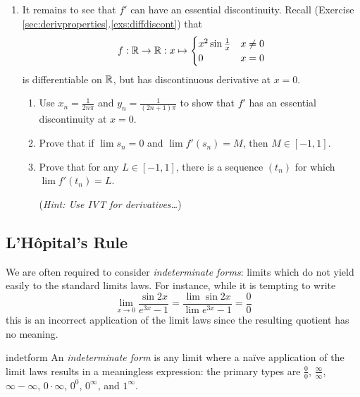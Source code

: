 \begin{exercises}
\begin{enumerate}
\begin{enumerate}
	  	\item It remains to see that $f'$ can have an essential discontinuity. Recall (Exercise \ref*{sec:derivproperties}.\ref{exs:diffdiscont}) that
			\[
				f:\mathbb{R}\to\mathbb{R}:x\mapsto 
				\begin{cases}
					x^2\sin\frac 1x&x\neq 0\\
					0&x=0
				\end{cases}
			\]
			is differentiable on $\mathbb{R}$, but has discontinuous derivative at $x=0$.
			\begin{enumerate}
	  		\item Use $x_n=\frac 1{2n\pi}$ and $y_n=\frac 1{(2n+1)\pi}$ to show that $f'$ has an essential discontinuity at $x=0$.
	  		\item Prove that if $\lim s_n=0$ and $\lim f'(s_n)=M$, then $M\in[-1,1]$.
				\item Prove that for any $L\in[-1,1]$, there is a sequence $(t_n)$ for which $\lim\limits f'(t_n)=L$.\par
				(\emph{Hint: Use IVT for derivatives\ldots})
			\end{enumerate}
	  \end{enumerate}
	\end{enumerate}
\end{exercises}


\goodbreak


\subsection{L'Hôpital's Rule}\label{sec:lhopital}

We are often required to consider \emph{indeterminate forms}: limits which do not yield easily to the standard limits laws. For instance, while it is tempting to write
\[
	\lim_{x\to 0}\frac{\sin 2x}{e^{3x}-1}
	=\frac{\lim\sin 2x}{\lim e^{3x}-1}
	=\frac 00 \tag{$\ast$}
\]
this is an incorrect application of the limit laws since the resulting quotient has no meaning.

\begin{defn}{}{indetform}
	An \emph{indeterminate form} is any limit where a naïve application of the limit laws results in a meaningless expression: the primary types are $\frac 00$, $\frac\infty\infty$, $\infty-\infty$, $0\cdot\infty$, $0^0$, $0^\infty$, and $1^\infty$.
\end{defn}

